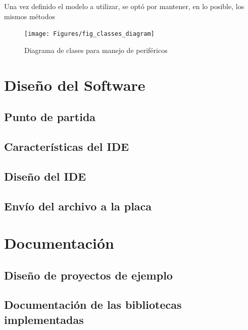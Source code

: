 Una vez definido el modelo a utilizar, se optó por mantener, en lo posible, los mismos métodos 

\begin{figure}[ht]
  \centering
    \texttt{[image: Figures/fig\_classes\_diagram]}
  \caption{Diagrama de clases para manejo de periféricos}
  \label{fig:classes}
\end{figure}


\section{Diseño del Software}

\subsection{Punto de partida} 

\subsection{Características del IDE} 

\subsection{Diseño del IDE} 

\subsection{Envío del archivo a la placa}

\section{Documentación}

\subsection{Diseño de proyectos de ejemplo} 

\subsection{Documentación de las bibliotecas implementadas} 



